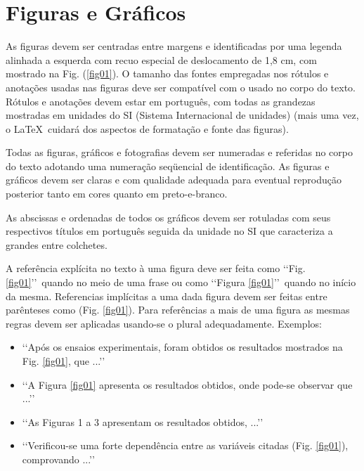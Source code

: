 \section{Figuras e Gráficos}

As figuras devem ser centradas entre margens e identificadas por uma legenda 
alinhada a esquerda com recuo especial de deslocamento de 1,8 cm, com mostrado 
na Fig. (\ref{fig01}). O tamanho das fontes empregadas nos rótulos e anotações 
usadas nas figuras deve ser compatível com o usado no corpo do texto. Rótulos e 
anotações devem estar em português, com todas as grandezas mostradas em 
unidades do SI (Sistema Internacional de unidades) (mais uma vez, o \LaTeX\
cuidará dos aspectos de formatação e fonte das figuras).

Todas as figuras, gráficos e fotografias devem ser numeradas e referidas no 
corpo do texto adotando uma numeração seqüencial de identificação. As figuras e 
gráficos devem ser claras e com qualidade adequada para eventual reprodução 
posterior tanto em cores quanto em preto-e-branco.

As abscissas e ordenadas de todos os gráficos devem ser rotuladas com seus 
respectivos títulos em português seguida da unidade no SI que caracteriza a 
grandes entre colchetes. 

A referência explícita no texto à uma figura deve ser feita como 
\lq\lq Fig. \ref{fig01}\rq\rq\ quando no meio de uma frase ou como 
\lq\lq Figura \ref{fig01}\rq\rq\ quando no início da mesma. Referencias 
implícitas a uma dada figura devem ser feitas entre parênteses como 
(Fig. \ref{fig01}). Para referências a mais de uma figura as mesmas regras 
devem ser aplicadas usando-se o plural adequadamente. Exemplos:

\begin{itemize}
	\item \lq\lq Após os ensaios experimentais, foram obtidos os resultados 
	mostrados na Fig. \ref{fig01}, que ...\rq\rq
	\item \lq\lq A Figura \ref{fig01} apresenta os resultados obtidos, onde 
	pode-se observar que ...\rq\rq
	\item \lq\lq As Figuras 1 a 3 apresentam os resultados obtidos, 
	...\rq\rq
	\item \lq\lq Verificou-se uma forte dependência entre as variáveis citadas 
	(Fig. \ref{fig01}), comprovando ...\rq\rq
\end{itemize}

